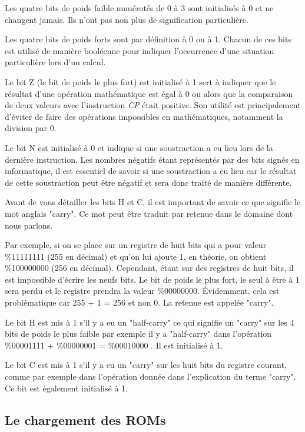 \documentclass[12pt, a4paper]{article}
\begin{document}
Les quatre bits de poids faible numérotés de 0 à 3 sont initialisés à 0 et ne changent jamais. Ils n'ont pas non plus de signification particulière.

Les quatre bits de poids forts sont par définition à 0 ou à 1. Chacun de ces bits est utilisé de manière booléenne pour indiquer l'occurrence d'une situation particulière lors d'un calcul.

\bigskip
Le bit Z (le bit de poids le plus fort) est initialisé à 1 sert à indiquer que le résultat d'une opération mathématique est égal à 0 ou alors que la comparaison de deux valeurs avec l'instruction \textit{CP} était positive. Son utilité est principalement d'éviter de faire des opérations impossibles en mathématiques, notamment la division par 0.
\bigskip

Le bit N est initialisé à 0 et indique si une soustraction a eu lieu lors de la dernière instruction. Les nombres négatifs étant représentés par des bits signés en informatique, il est essentiel de savoir si une soustraction a eu lieu car le résultat de cette soustraction peut être négatif et sera donc traité de manière différente.
\bigskip

\pagebreak

Avant de vous détailler les bits H et C, il est important de savoir ce que signifie le mot anglais "carry". Ce mot peut être traduit par retenue dans le domaine dont nous parlons. 

\bigskip
Par exemple, si on se place sur un registre de huit bits qui a pour valeur \%11111111 (255 en décimal) et qu'on lui ajoute 1, en théorie, on obtient \%100000000 (256 en décimal). Cependant, étant sur des registres de huit bits, il est impossible d'écrire les neufs bits. Le bit de poids le plus fort, le seul à être à 1 sera perdu et le registre prendra la valeur \%00000000. Évidemment, cela est problématique car 255 + 1 = 256 et non 0. La retenue est appelée "carry".
\bigskip


Le bit H est mis à 1 s'il y a eu un "half-carry" ce qui signifie un "carry" sur les 4 bits de poids le plus faible par exemple il y a "half-carry" dans l'opération \%00001111 + \%00000001 = \%00010000 . Il est initialisé à 1.
\bigskip

Le bit C est mis à 1 s'il y a eu un "carry" sur les huit bits du registre courant, comme par exemple dans l'opération donnée dans l'explication du terme "carry". Ce bit est également initialisé à 1.



\subsection{Le chargement des ROMs}
\end{document}
